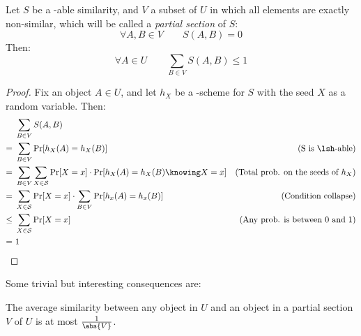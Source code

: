 \begin{lemma} \label{lem:center}
    Let $S$ be a \lsh-able similarity, and $V$ a subset of $U$ in which all elements are exactly non-similar, which will be called a \emph{partial section} of $S$:
    \[
        \forall A, B \in V \qquad S(A, B) = 0
    \]
    Then:
    \[
        \forall A \in U \qquad \sum_{B \in V} S(A, B) \leq 1
    \]
\end{lemma}

\begin{proof}

    Fix an object $A \in U$, and let $h_X$ be a \lsh-scheme for $S$ with the seed $X$ as a random variable. Then:
    \begin{align*}
            &\ \sum_{B \in V} S(A, B)                                                                       & \\
           =&\ \sum_{B \in V} \Pr[h_X(A) = h_X(B)]                                                          & \text{(S is \lsh-able)} \\
           =&\ \sum_{B \in V} \sum_{X \in \mathcal{S}} \Pr[X = x] \cdot \Pr[h_X(A) = h_X(B) \knowing X = x] & \text{(Total prob. on the seeds of $h_X$)} \\
           =&\ \sum_{X \in \mathcal{S}} \Pr[X = x] \cdot \sum_{B \in V} \Pr[h_x(A) = h_x(B)]                & \text{(Condition collapse)} \\
        \leq&\ \sum_{X \in \mathcal{S}} \Pr[X = x]                                                          & \text{(Any prob. is between 0 and 1)} \\
           =&\ 1                                                                                            &
    \end{align*}
\end{proof}

Some trivial but interesting consequences are:

\begin{corollary}
    The average similarity between any object in $U$ and an object in a partial section $V$ of $U$ is at most $\frac{1}{\abs{V}}$.
\end{corollary}

